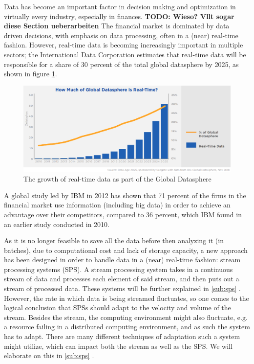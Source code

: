 \quad Data has become an important factor in decision making and optimization in virtually every industry, especially in finances. \textbf{TODO: Wieso? Vllt sogar diese Section ueberarbeiten}
The financial market is dominated by data driven decisions, with emphasis on data processing, often in a (near) real-time fashion.
However, real-time data is becoming increasingly important in multiple sectors; the International Data Corporation estimates that real-time data will be 
responsible for a share of 30 percent of the total global datasphere by 2025, as shown in figure \ref{fig:growth_realtime_data}.
\begin{figure}[ht]
\centering
\includegraphics[width=1.0\textwidth]{Bilder/realtime_data.png}
\caption{The growth of real-time data as part of the Global Datasphere \cite[p. 13]{idc-seagate-data}}
\label{fig:growth_realtime_data}
\end{figure}

\quad A global study led by IBM in 2012 has shown that 71 percent of the firms in the financial market use information (including big data)
in order to achieve an advantage over their competitors, compared to 36 percent, which IBM found in an earlier study conducted in 2010. \cite[p. 1]{ibm-financial}

\quad As it is no longer feasible to save all the data before then analyzing it (in batches), due to computational cost and lack of storage capacity, 
a new approach has been designed in order to handle data in a (near) real-time fashion: stream processing systems (SPS). 
A stream processing system takes in a continuous stream of data and processes each element of said stream, and then puts out a stream of processed data.
These systems will be further explained in \ref{sub:sps} .
\\
\quad However, the rate in which data is being streamed fluctuates, so one comes to the logical conclusion that SPSs should adapt to the velocity and volume of the stream.
Besides the stream, the computing environment might also fluctuate, e.g. a resource failing in a distributed computing environment, 
and as such the system has to adapt. There are many different techniques of adaptation such a system might utilize, 
which can impact both the stream as well as the SPS. We will elaborate on this in \ref{sub:sps} .

